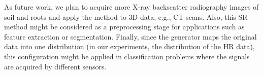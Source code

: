 \documentclass[10pt,twocolumn,letterpaper]{article}
\begin{document}
As future work, we plan to acquire more X-ray backscatter radiography images of soil and roots and apply the method to 3D data, e.g., CT scans. Also, this SR method might be considered as a preprocessing stage for applications such as feature extraction or segmentation. Finally, since the generator maps the original data into one distribution (in our experiments, the distribution of the HR data), this configuration might be applied in classification problems where the signals are acquired by different sensors.


{\small


}
\end{document}
